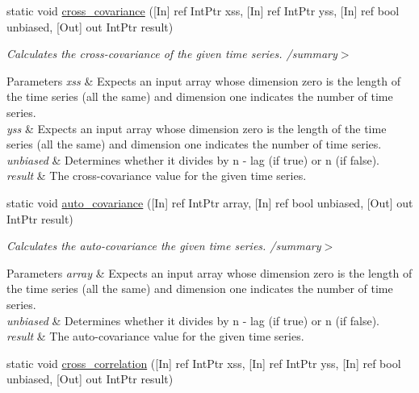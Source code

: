 \begin{DoxyCompactItemize}
static void \mbox{\hyperlink{classkhiva_1_1interop_1_1_d_l_l_features_a50a567df5e829e1c4139598139ffc227}{cross\+\_\+covariance}} (\mbox{[}In\mbox{]} ref Int\+Ptr xss, \mbox{[}In\mbox{]} ref Int\+Ptr yss, \mbox{[}In\mbox{]} ref bool unbiased, \mbox{[}Out\mbox{]} out Int\+Ptr result)
\begin{DoxyCompactList}\small\item\em Calculates the cross-\/covariance of the given time series. /summary$>$ 
\begin{DoxyParams}{Parameters}
{\em xss} & Expects an input array whose dimension zero is the length of the time series (all the same) and dimension one indicates the number of time series.\\
\hline
{\em yss} & Expects an input array whose dimension zero is the length of the time series (all the same) and dimension one indicates the number of time series.\\
\hline
{\em unbiased} & Determines whether it divides by n -\/ lag (if true) or n (if false).\\
\hline
{\em result} & The cross-\/covariance value for the given time series.\\
\hline
\end{DoxyParams}
\end{DoxyCompactList}\item 
static void \mbox{\hyperlink{classkhiva_1_1interop_1_1_d_l_l_features_afafe384c3cddf5d2f3b3c294971b0a50}{auto\+\_\+covariance}} (\mbox{[}In\mbox{]} ref Int\+Ptr array, \mbox{[}In\mbox{]} ref bool unbiased, \mbox{[}Out\mbox{]} out Int\+Ptr result)
\begin{DoxyCompactList}\small\item\em Calculates the auto-\/covariance the given time series. /summary$>$ 
\begin{DoxyParams}{Parameters}
{\em array} & Expects an input array whose dimension zero is the length of the time series (all the same) and dimension one indicates the number of time series.\\
\hline
{\em unbiased} & Determines whether it divides by n -\/ lag (if true) or n (if false).\\
\hline
{\em result} & The auto-\/covariance value for the given time series.\\
\hline
\end{DoxyParams}
\end{DoxyCompactList}\item 
static void \mbox{\hyperlink{classkhiva_1_1interop_1_1_d_l_l_features_a857ec574d5fb5492b861efff45494932}{cross\+\_\+correlation}} (\mbox{[}In\mbox{]} ref Int\+Ptr xss, \mbox{[}In\mbox{]} ref Int\+Ptr yss, \mbox{[}In\mbox{]} ref bool unbiased, \mbox{[}Out\mbox{]} out Int\+Ptr result)

\end{DoxyCompactItemize}
